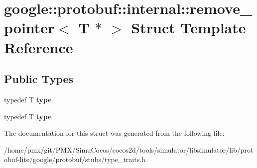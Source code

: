 \hypertarget{structgoogle_1_1protobuf_1_1internal_1_1remove__pointer_3_01T_01_5_01_4}{}\section{google\+:\+:protobuf\+:\+:internal\+:\+:remove\+\_\+pointer$<$ T $\ast$ $>$ Struct Template Reference}
\label{structgoogle_1_1protobuf_1_1internal_1_1remove__pointer_3_01T_01_5_01_4}
\subsection*{Public Types}
\begin{DoxyCompactItemize}
\item 
\mbox{\label{structgoogle_1_1protobuf_1_1internal_1_1remove__pointer_3_01T_01_5_01_4_a46481ead00e78e2faab8b60070ac7ebe}} 
typedef T {\bfseries type}
\item 
\mbox{\label{structgoogle_1_1protobuf_1_1internal_1_1remove__pointer_3_01T_01_5_01_4_a46481ead00e78e2faab8b60070ac7ebe}} 
typedef T {\bfseries type}
\end{DoxyCompactItemize}


The documentation for this struct was generated from the following file\+:\begin{DoxyCompactItemize}
\item 
/home/pmx/git/\+P\+M\+X/\+Simu\+Cocos/cocos2d/tools/simulator/libsimulator/lib/protobuf-\/lite/google/protobuf/stubs/type\+\_\+traits.\+h\end{DoxyCompactItemize}

